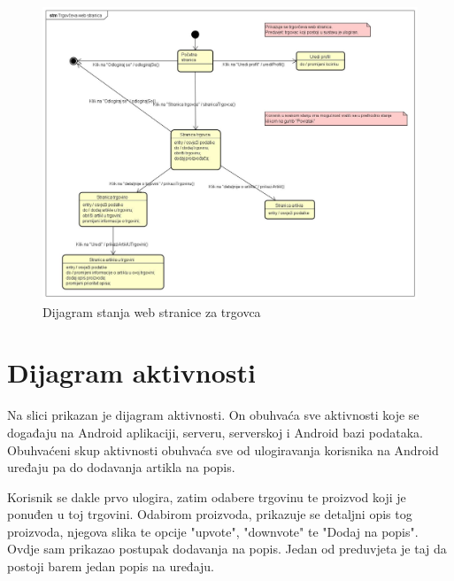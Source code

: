 			\begin{figure}[H]
				\centering
				\includegraphics[width=1.0\linewidth]{dijagrami/web-trgovac.jpg}
				\caption{Dijagram stanja web stranice za trgovca}
				\label{fig:state-web-trgovac}
			\end{figure}
			
		
		\section{Dijagram aktivnosti}
			Na slici prikazan je dijagram aktivnosti. On obuhvaća sve aktivnosti koje se događaju na Android aplikaciji, serveru, serverskoj i Android bazi podataka. Obuhvaćeni skup aktivnosti obuhvaća sve od ulogiravanja korisnika na Android uređaju pa do dodavanja artikla na popis.
			
			Korisnik se dakle prvo ulogira, zatim odabere trgovinu te proizvod koji je ponuđen u toj trgovini. Odabirom proizvoda, prikazuje se detaljni opis tog proizvoda, njegova slika te opcije "upvote", "downvote" te "Dodaj na popis". Ovdje sam prikazao postupak dodavanja na popis. Jedan od preduvjeta je taj da postoji barem jedan popis na uređaju.
			
